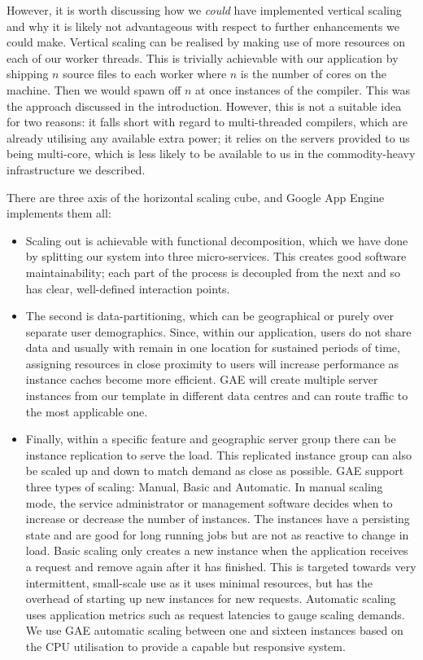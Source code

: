 \documentclass[conference]{IEEEtran}
\begin{document}
However, it is worth discussing how we \emph{could} have implemented vertical
scaling and why it is likely not advantageous with respect to further
enhancements we could make. Vertical scaling can be realised by making use of
more resources on each of our worker threads. This is trivially achievable with
our application by shipping $n$ source files to each worker where $n$ is the
number of cores on the machine. Then we would spawn off $n$ at once instances of
the compiler. This was the approach discussed in the introduction. However, this is
not a suitable idea for two reasons: it falls short with regard to
multi-threaded compilers, which are already utilising any available extra power;
it relies on the servers provided to us being multi-core, which is less likely
to be available to us in the commodity-heavy infrastructure we described.

There are three axis of the horizontal scaling cube, and Google App Engine
implements them all:

\begin{itemize}
\item Scaling out is achievable with functional decomposition, which we have
done by splitting our system into three micro-services. This creates good software
maintainability; each part of the process is decoupled from the next and
so has clear, well-defined interaction points.

\item The second is data-partitioning, which can be geographical or purely over
separate user demographics. Since, within our application, users do not share
data and usually with remain in one location for sustained periods of time,
assigning resources in close proximity to users will increase performance as
instance caches become more efficient. GAE will create multiple server 
instances from our template in different data centres and can route traffic to
the most applicable one.

\item Finally, within a specific feature and geographic server group there can
be instance replication to serve the load. This replicated instance group can also
be scaled up and down to match demand as close as possible. GAE support three
types of scaling: Manual, Basic and Automatic. In manual scaling mode, the
service administrator or management software decides when to increase or
decrease the number of instances. The instances have a persisting state and are
good for long running jobs but are not as reactive to change in load. Basic
scaling only creates a new instance when the application receives a request and
remove again after it has finished. This is targeted towards very intermittent,
small-scale use as it uses minimal resources, but has the overhead of starting
up new instances for new requests. Automatic scaling uses application metrics 
such as request latencies to gauge scaling demands. We use GAE automatic
scaling between one and sixteen instances based on the CPU utilisation to
provide a capable but responsive system.
\end{itemize}
\end{document}
